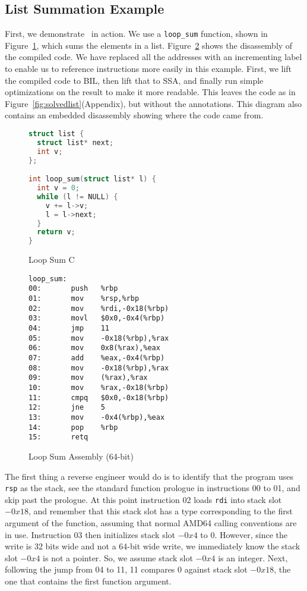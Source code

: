 \subsection{List Summation Example}
\label{subsec:workedexample}
First, we demonstrate \bitr\ in action. We use a \texttt{loop\_sum} function, shown in Figure~\ref{fig:loop-sum-c}, which sums the elements in a list. Figure~\ref{fig:loop-sum-asm64} shows the disassembly of the compiled code. We have replaced all the addresses with an incrementing label to enable us to reference instructions more easily in this example.
First, we lift the compiled code to BIL, then lift that to SSA, and finally run simple optimizations on the result to make it more readable. This leaves the code as in Figure~\ref{fig:solvedlist}(Appendix), but without the annotations. This diagram also contains an embedded disassembly showing where the code came from.

\begin{small}
\begin{figure}
\begin{lstlisting}[language=C]
struct list {
  struct list* next;
  int v;
};

int loop_sum(struct list* l) {
  int v = 0;
  while (l != NULL) {
    v += l->v;
    l = l->next;
  }
  return v;
}
\end{lstlisting}
\caption{Loop Sum C}
\label{fig:loop-sum-c}
\end{figure}
\end{small}
\begin{small}
\begin{figure}
\begin{lstlisting}[language={[x86masm]Assembler}]
loop_sum:
00:       push   %rbp
01:       mov    %rsp,%rbp
02:       mov    %rdi,-0x18(%rbp)
03:       movl   $0x0,-0x4(%rbp)
04:       jmp    11
05:       mov    -0x18(%rbp),%rax
06:       mov    0x8(%rax),%eax
07:       add    %eax,-0x4(%rbp)
08:       mov    -0x18(%rbp),%rax
09:       mov    (%rax),%rax
10:       mov    %rax,-0x18(%rbp)
11:       cmpq   $0x0,-0x18(%rbp)
12:       jne    5
13:       mov    -0x4(%rbp),%eax
14:       pop    %rbp
15:       retq   
\end{lstlisting}
\caption{Loop Sum Assembly (64-bit)}
\label{fig:loop-sum-asm64}
\end{figure}
\end{small}

The first thing a reverse engineer would do is to identify that the program uses \texttt{rsp} as the stack, see the standard function prologue in instructions 00 to 01, and skip past the prologue. At this point instruction 02 loads \texttt{rdi} into stack slot $-0x18$, and remember that this stack slot has a type corresponding to the first argument of the function, assuming that normal AMD64 calling conventions are in use. Instruction 03 then initializes stack slot $-0x4$ to $0$. However, since the write is 32 bits wide and not a 64-bit wide write, we immediately know the stack slot $-0x4$ is not a pointer. So, we assume stack slot $-0x4$ is an integer. Next, following the jump from 04 to 11, 11 compares $0$ against stack slot $-0x18$, the one that contains the first function argument.

